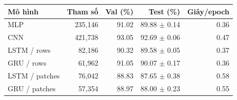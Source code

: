 \begin{tabularx}{\textwidth}{@{}Xrrrr@{}}
\toprule
Mô hình & Tham số & Val (\%) & Test (\%) & Giây/epoch \\
\midrule
MLP & 235,146 & 91.02 & 89.88 $\pm$ 0.14 & 0.36 \\
CNN & 421,738 & 93.05 & 92.69 $\pm$ 0.06 & 0.47 \\
LSTM / rows & 82,186 & 90.32 & 89.58 $\pm$ 0.05 & 0.37 \\
GRU / rows & 61,962 & 91.05 & 90.07 $\pm$ 0.17 & 0.36 \\
LSTM / patches & 76,042 & 88.83 & 87.65 $\pm$ 0.38 & 0.58 \\
GRU / patches & 57,354 & 88.97 & 88.00 $\pm$ 0.23 & 0.55 \\
\bottomrule
\end{tabularx}
